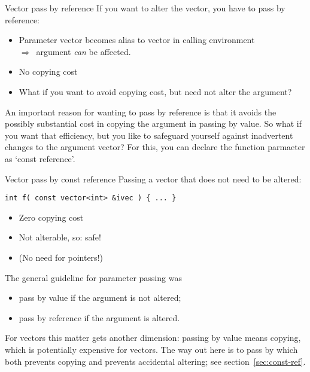 

\begin{slide}{Vector pass by reference}
  \label{sl:vector-arg-ref}
  If you want to alter the vector, you have to pass by reference:
  \begin{itemize}
  \item Parameter vector becomes alias to vector in calling environment\\
    $\Rightarrow$~argument \emph{can} be affected.
  \item No copying cost
  \item What if you want to avoid copying cost, but need not alter the argument?
  \end{itemize}
\end{slide}

An important reason for wanting to pass by reference is that it avoids
the possibly substantial cost in copying the argument in passing by value.
So what if you want that efficiency, but you like to safeguard yourself
against inadvertent changes to the argument vector?
For this, you can declare the function parmaeter as `const reference'.

\begin{block}{Vector pass by const reference}
  \label{sl:vector-const-ref}
  Passing a vector that does not need to be altered:
\begin{lstlisting}
int f( const vector<int> &ivec ) { ... }    
\end{lstlisting}
\begin{itemize}
\item Zero copying cost
\item Not alterable, so: safe!
\item (No need for pointers!)
\end{itemize}
\end{block}

The general guideline for parameter passing was
\begin{itemize}
\item pass by value if the argument is not altered;
\item pass by reference if the argument is altered.
\end{itemize}
For vectors this matter gets another dimension:
passing by value means copying, which is potentially expensive for vectors.
The way out here is to pass by 
which both prevents copying and prevents accidental altering;
see section~\ref{sec:const-ref}.

